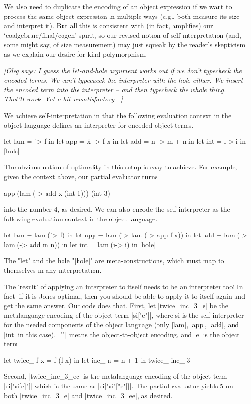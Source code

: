 \documentclass[preprint]{sigplanconf}
\newcommand{\oleg}[1]{{\it [Oleg says: #1]}}
\begin{document}
We also need to duplicate the encoding of an object expression if we
want to process the same object expression in multiple ways (e.g., both
measure its size and interpret it).  But all this is consistent with (in
fact, amplifies) our `coalgebraic/final/cogen' spirit, so our revised
notion of self-interpretation (and, some might say, of size measurement)
may just squeak by the reader's skepticism as we explain our desire for
kind polymorphism.

\oleg{I guess the let-and-hole argument works out if we don't typecheck the
encoded terms. We can't typecheck the interpreter with the hole
either. We insert the encoded term into the interpreter -- and then
typecheck the whole thing. That'll work. Yet a bit unsatisfactory...}

We achieve
self-interpretation in that the following evaluation context in the
object language defines an interpreter for encoded object terms.
\begin{code}
  let lam = \f -> f in
  let app = \f x -> f x in
  let add = \m n -> m + n in
  let int = \i -> i in
  [hole]
\end{code}
The obvious notion of optimality in this setup is easy to achieve.  For
example, given the context above, our partial evaluator turns
\begin{code}
  app (lam (\x -> add x (int 1))) (int 3)
\end{code}
into the number 4, as desired.  We can also encode the self-interpreter
as the following evaluation context in the object language.
\begin{code}
  let lam = lam (\f -> f) in
  let app = lam (\f -> lam (\x -> app f x)) in
  let add = lam (\m -> lam (\n -> add m n)) in
  let int = lam (\i -> i) in
  [hole]
\end{code}
The "let" and the hole "[hole]" are meta-constructions, which must map to
themselves in any interpretation.  

The 'result' of applying an interpreter to itself needs to be an 
interpreter too!  In fact, if it is Jones-optimal, then you should be 
able to apply it to itself again and get the same answer.  
Our code does that. First, let |twice_inc_3_e| be the
metalanguage encoding of the object term |si["e"]|,
where si is the self-interpreter for the needed components of the object
language (only |lam|, |app|, |add|, and |int| in this case), |""| means the
object-to-object encoding, and |e| is the object term
\begin{code}
  let twice_ f x = f (f x) in let inc_ n = n + 1 in twice_ inc_ 3
\end{code}
Second, |twice_inc_3_ee| is the metalanguage encoding of the object term
|si["si[e]"]|
which is the same as
|si["si"["e"]]|.
The partial evaluator yields 5 on both |twice_inc_3_e| and 
|twice_inc_3_ee|,
as desired.
\end{document}
